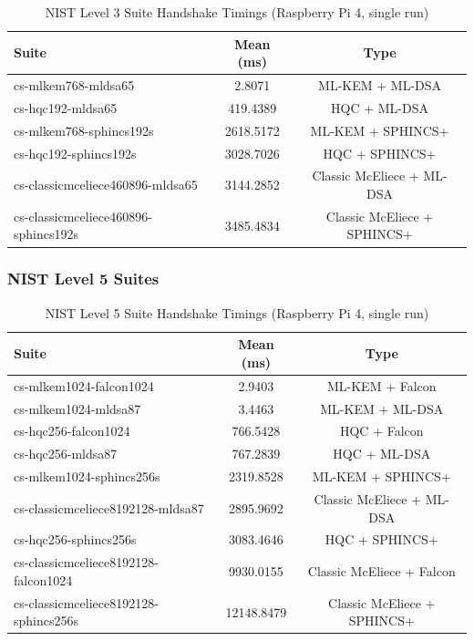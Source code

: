 \documentclass[conference]{IEEEtran}
\begin{document}
\begin{table}[htbp]
\centering
\caption{NIST Level 3 Suite Handshake Timings (Raspberry Pi 4, single run)}
\begin{tabular}{lcc}
\toprule
\textbf{Suite} & \textbf{Mean (ms)} & \textbf{Type} \\
\midrule
cs-mlkem768-mldsa65 & 2.8071 & ML-KEM + ML-DSA \\
cs-hqc192-mldsa65 & 419.4389 & HQC + ML-DSA \\
cs-mlkem768-sphincs192s & 2618.5172 & ML-KEM + SPHINCS+ \\
cs-hqc192-sphincs192s & 3028.7026 & HQC + SPHINCS+ \\
cs-classicmceliece460896-mldsa65 & 3144.2852 & Classic McEliece + ML-DSA \\
cs-classicmceliece460896-sphincs192s & 3485.4834 & Classic McEliece + SPHINCS+ \\
\bottomrule
\end{tabular}
\end{table}

\subsubsection{NIST Level 5 Suites}

\begin{table}[htbp]
\centering
\caption{NIST Level 5 Suite Handshake Timings (Raspberry Pi 4, single run)}
\begin{tabular}{lcc}
\toprule
\textbf{Suite} & \textbf{Mean (ms)} & \textbf{Type} \\
\midrule
cs-mlkem1024-falcon1024 & 2.9403 & ML-KEM + Falcon \\
cs-mlkem1024-mldsa87 & 3.4463 & ML-KEM + ML-DSA \\
cs-hqc256-falcon1024 & 766.5428 & HQC + Falcon \\
cs-hqc256-mldsa87 & 767.2839 & HQC + ML-DSA \\
cs-mlkem1024-sphincs256s & 2319.8528 & ML-KEM + SPHINCS+ \\
cs-classicmceliece8192128-mldsa87 & 2895.9692 & Classic McEliece + ML-DSA \\
cs-hqc256-sphincs256s & 3083.4646 & HQC + SPHINCS+ \\
cs-classicmceliece8192128-falcon1024 & 9930.0155 & Classic McEliece + Falcon \\
cs-classicmceliece8192128-sphincs256s & 12148.8479 & Classic McEliece + SPHINCS+ \\
\bottomrule
\end{tabular}
\end{table}
\end{document}
